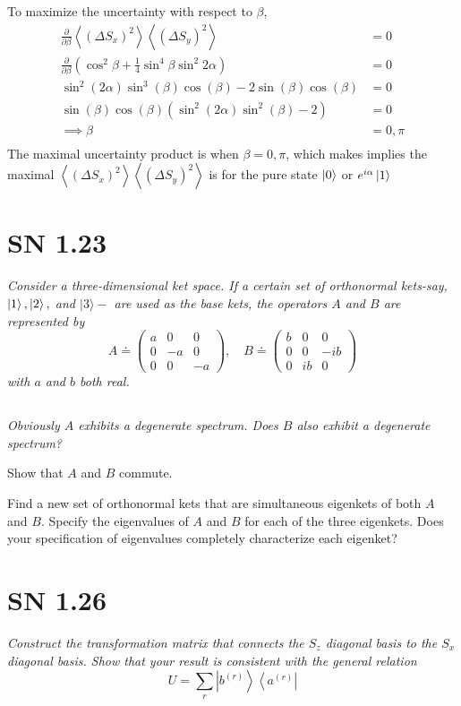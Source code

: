 \documentclass{article}
\begin{document}
To maximize the uncertainty with respect to $\beta$, 
\begin{align*}
    \frac{\partial}{\partial \beta} \left\langle\left(\Delta S_{x}\right)^{2}\right\rangle\left\langle\left(\Delta S_{y}\right)^{2}\right\rangle &= 0\\
     \frac{\partial}{\partial \beta} \left(\cos ^{2} \beta+\frac{1}{4} \sin ^{4} \beta \sin ^{2} 2  \alpha\right) &= 0\\
     \sin ^2(2 \alpha ) \sin ^3(\beta ) \cos (\beta )-2 \sin (\beta ) \cos (\beta ) &= 0\\
     \sin (\beta ) \cos (\beta ) \left(\sin ^2(2 \alpha ) \sin ^2(\beta )-2\right)&=0\\
     \implies \beta &= 0, \pi\\
\end{align*}
 The maximal uncertainty product is when $\beta = 0,\pi$, which makes implies the maximal $\left\langle\left(\Delta S_{x}\right)^{2}\right\rangle\left\langle\left(\Delta S_{y}\right)^{2}\right\rangle$ is for the pure state $\ket{0}$ or $e^{i \alpha}\ket{1}$


\newpage

\section{SN 1.23} 
\textit{Consider a three-dimensional ket space. If a certain set of orthonormal kets-say, $\ket{1},\ket{2},$ and $|3\rangle-$ are used as the base kets, the operators $A$ and $B$ are represented by
$$
A \doteq\left(\begin{array}{ccc}
a & 0 & 0 \\
0 & -a & 0 \\
0 & 0 & -a
\end{array}\right), \quad B \doteq\left(\begin{array}{ccc}
b & 0 & 0 \\
0 & 0 & -i b \\
0 & i b & 0
\end{array}\right)
$$ with $a$ and $b$ both real.}

\subsection{}
\textit{Obviously $A$ exhibits a degenerate spectrum. Does $B$ also exhibit a degenerate spectrum?}

Show that $A$ and $B$ commute.

Find a new set of orthonormal kets that are simultaneous eigenkets of both $A$ and $B .$ Specify the eigenvalues of $A$ and $B$ for each of the three eigenkets. Does your specification of eigenvalues completely characterize each eigenket?


\newpage
\section{SN 1.26}
\textit{Construct the transformation matrix that connects the $S_{z}$ diagonal basis to the $S_{x}$ diagonal basis. Show that your result is consistent with the general relation
$$
U=\sum_{r}\left|b^{(r)}\right\rangle\left\langle a^{(r)}\right|
$$}
\end{document}

